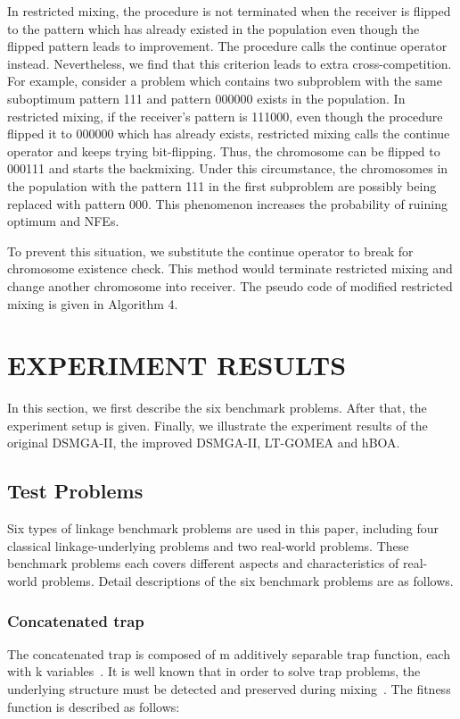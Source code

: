 \documentclass{sig-alternate-05-2015}
\begin{document}
In restricted mixing, the procedure is not terminated when the receiver is flipped to the pattern which has already existed in the population even though the flipped pattern leads to improvement. The procedure calls the continue operator instead. Nevertheless, we find that this criterion leads to extra cross-competition. For example, consider a problem which contains two subproblem with the same suboptimum pattern 111 and pattern 000000 exists in the population. In restricted mixing, if the receiver’s pattern is 111000, even though the procedure flipped it to 000000 which has already exists, restricted mixing calls the continue operator and keeps trying bit-flipping. Thus, the chromosome can be flipped to 000111 and starts the backmixing. Under this circumstance, the chromosomes in the population with the pattern 111 in the first subproblem are possibly being replaced with pattern 000. This phenomenon increases the probability of ruining optimum and NFEs. 


To prevent this situation, we substitute the continue operator to break for chromosome existence check. This method would terminate restricted mixing and change another chromosome into receiver. The pseudo code of modified restricted mixing is given in Algorithm 4. 







\section{EXPERIMENT RESULTS}
In this section, we first describe the six benchmark problems. After that, the experiment setup is given. Finally, we illustrate the experiment results of the original DSMGA-II, the improved DSMGA-II, LT-GOMEA and hBOA. 


\subsection{Test Problems}
Six types of linkage benchmark problems are used in this paper, including four classical linkage-underlying problems and two real-world problems. These benchmark problems each covers different aspects and characteristics of real-world problems. Detail descriptions of the six benchmark problems are as follows.


\subsubsection{Concatenated trap}
The concatenated trap is composed of m additively separable trap function, each with k variables~\cite{goldberg:deception}. It is well known that in order to solve trap problems, the underlying structure must be detected and preserved during mixing~\cite{pelikan:overlap}. The fitness function is described as follows:
\end{document}
